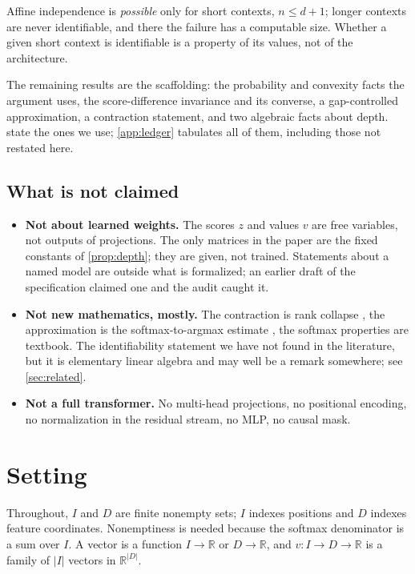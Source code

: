 \documentclass[11pt]{article}
\newcommand{\R}{\mathbb{R}}
\begin{document}
Affine independence is \emph{possible} only for short contexts, $n \le d+1$;
longer contexts are never identifiable, and there the failure has a computable
size. Whether a given short context is identifiable is a property of its
values, not of the architecture.

The remaining results are the scaffolding: the probability and convexity
facts the argument uses, the score-difference invariance and its converse, a
gap-controlled approximation, a contraction statement, and two algebraic facts
about depth.  state the ones we use;
\cref{app:ledger} tabulates all of them, including those not restated here.

\subsection{What is not claimed}

\begin{itemize}
\item \textbf{Not about learned weights.} The scores $z$ and values $v$ are
  free variables, not outputs of projections. The only matrices in the paper
  are the fixed constants of \cref{prop:depth}; they are given, not trained.
  Statements about a named model are outside what is formalized; an earlier
  draft of the specification claimed one and the audit caught it.
\item \textbf{Not new mathematics, mostly.} The contraction is rank collapse
  \cite{dong}, the approximation is the softmax-to-argmax estimate
  \cite{hardattn}, the softmax properties are textbook. The identifiability
  statement we have not found in the literature, but it is elementary linear
  algebra and may well be a remark somewhere; see \cref{sec:related}.
\item \textbf{Not a full transformer.} No multi-head projections, no positional
  encoding, no normalization in the residual stream, no MLP, no causal mask.
\end{itemize}

\section{Setting}\label{sec:setup}

Throughout, $I$ and $D$ are finite nonempty sets; $I$ indexes positions and
$D$ indexes feature coordinates. Nonemptiness is needed because the softmax
denominator is a sum over $I$. A vector is a function $I \to \R$ or $D \to \R$, and
$v : I \to D \to \R$ is a family of $|I|$ vectors in $\R^{|D|}$.
\end{document}
